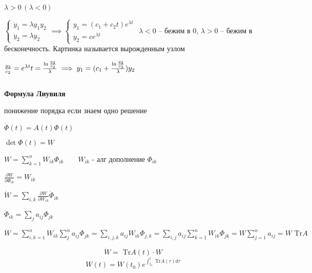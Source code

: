 \documentclass[12pt, a4paper]{article}
\begin{document}
     $\lambda > 0 \,(\lambda < 0)$

    \quad$\begin{cases}
        \dot y_1 = \lambda y_1 y_2 \\ \dot y_2 = \lambda y_2
    \end{cases} \implies 
    \begin{cases}
        y_1 = (c_1 + c_2t)e^{\lambda t}\\
        y_2 = ce^{\lambda t}
    \end{cases}$
    $\lambda < 0 $ -- бежим в 0, $\lambda > 0$ -- бежим в бесконечность. 
    Картинка называется вырожденным узлом

    $\frac{y_2}{c_2} = e^{\lambda t}\\ 
    t = \frac{\ln \frac{y_2}{c_2}}{\lambda} \implies 
    y_1 = (c_1 + \frac{\ln \frac{y_2}{c_2}}{\lambda})y_2$

    \par $ $
    
    \textbf{Формула Лиувиля}
    
    понижение порядка если знаем одно решение

    $\dot \Phi(t) = A(t)\Phi(t)$

    $\det \Phi(t) = W$ %

    $W = \sum^n_{k=1} W_{ik} \Phi_{ik}\qquad W_{ik}$ - алг дополнение $\Phi_{ik}$

    $\displaystyle\frac{\partial W}{\partial \Phi_{ik}} = W_{ik}$

    $\dot W = \sum_{i,k} \frac{\partial W}{\partial W_{ik}}\dot\Phi_{ik}$

    $\dot\Phi_{ik} = \sum_j a_{ij} \Phi_{jk}$

    $\dot W = \sum_{i,k =1}^n W_{ik}\sum_j^n a_{ij}\Phi_{jk} = 
    \sum_{i,j,k}a_{ij}W_{ik} \Phi_{j,k} = 
    \sum_{i,j}a_{ij}\sum^n_{k=1}W_{ik}\Phi_{jk} = W \sum^n_{j=1}a_{ij} = 
    W\text { Tr} A$

    $$\dot W = \text{ Tr}A(t) \cdot W$$
    $$W(t) = W(t_0)e^{\int^t_{t_0} \text{ Tr}A (\tau)d\tau}$$
\end{document}
